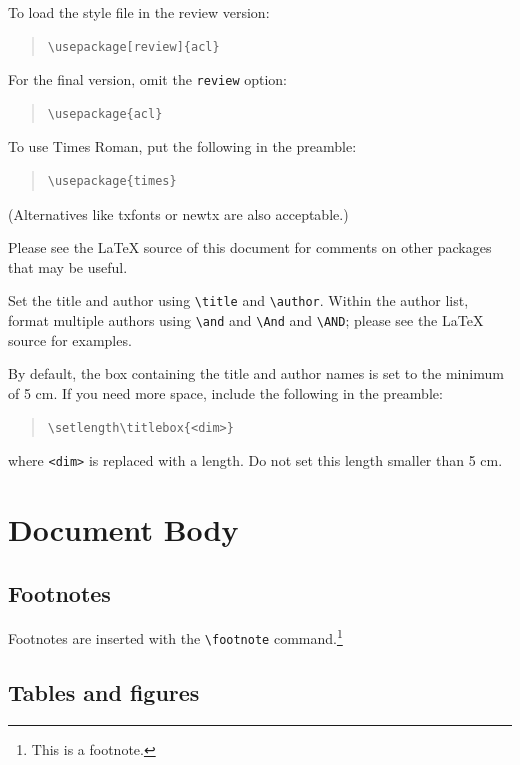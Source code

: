 \documentclass[11pt]{article}
\begin{document}
To load the style file in the review version:
\begin{quote}
\begin{verbatim}
\usepackage[review]{acl}
\end{verbatim}
\end{quote}
For the final version, omit the \verb|review| option:
\begin{quote}
\begin{verbatim}
\usepackage{acl}
\end{verbatim}
\end{quote}

To use Times Roman, put the following in the preamble:
\begin{quote}
\begin{verbatim}
\usepackage{times}
\end{verbatim}
\end{quote}
(Alternatives like txfonts or newtx are also acceptable.)

Please see the \LaTeX{} source of this document for comments on other packages that may be useful.

Set the title and author using \verb|\title| and \verb|\author|. Within the author list, format multiple authors using \verb|\and| and \verb|\And| and \verb|\AND|; please see the \LaTeX{} source for examples.

By default, the box containing the title and author names is set to the minimum of 5 cm. If you need more space, include the following in the preamble:
\begin{quote}
\begin{verbatim}
\setlength\titlebox{<dim>}
\end{verbatim}
\end{quote}
where \verb|<dim>| is replaced with a length. Do not set this length smaller than 5 cm.

\section{Document Body}

\subsection{Footnotes}

Footnotes are inserted with the \verb|\footnote| command.\footnote{This is a footnote.}

\subsection{Tables and figures}
\end{document}
